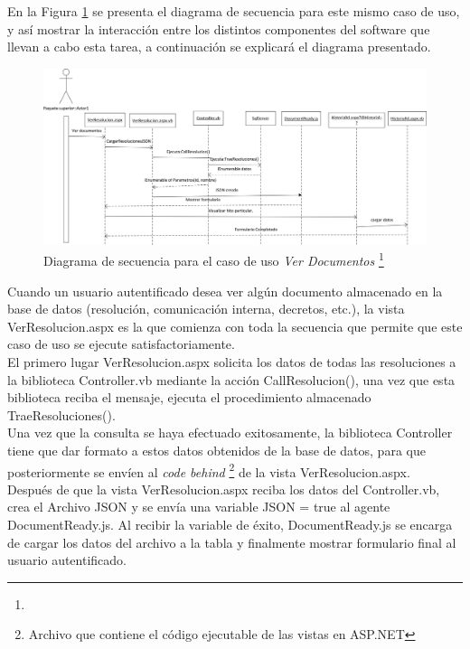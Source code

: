 	
	
			En la Figura \ref{diagrama_secuencial_ver_documento} se presenta el diagrama de secuencia para este mismo caso de uso, y así mostrar la interacción entre los distintos componentes del software que llevan a cabo esta tarea, a continuación se explicará el diagrama presentado.
			\begin{figure}[H]
				\centering
				\includegraphics[width=1\textwidth]{images/Capitulo_3/ver_Documentos.png}
				\caption[Diagrama de secuencia para el caso de uso \textit{Ver Documentos}]{Diagrama de secuencia para el caso de uso \textit{Ver Documentos} \footnote{}}
				\label{diagrama_secuencial_ver_documento}
			\end{figure}
			

	Cuando un usuario autentificado desea ver algún documento almacenado en la base de datos (resolución, comunicación interna, decretos, etc.), la vista VerResolucion.aspx es la que comienza con toda la secuencia que permite que este caso de uso se ejecute satisfactoriamente.
	\\
	
	El primero lugar VerResolucion.aspx solicita los datos de todas las resoluciones a la biblioteca Controller.vb mediante la acción CallResolucion(), una vez que esta biblioteca reciba el mensaje, ejecuta el procedimiento almacenado TraeResoluciones().
	\\
	
	Una vez que la consulta se haya efectuado exitosamente, la biblioteca Controller tiene que dar formato a estos  datos obtenidos de la base de datos, para que posteriormente se envíen al \textit{code behind} \footnote{Archivo que contiene el código ejecutable de las vistas en ASP.NET} de la vista VerResolucion.aspx.
	\\
	
	Después de que la vista VerResolucion.aspx reciba los datos del Controller.vb, crea el Archivo JSON y se envía una variable JSON = true al agente DocumentReady.js. Al recibir la variable de éxito, DocumentReady.js se encarga de cargar los datos del archivo a la tabla y finalmente mostrar formulario final al usuario autentificado.






